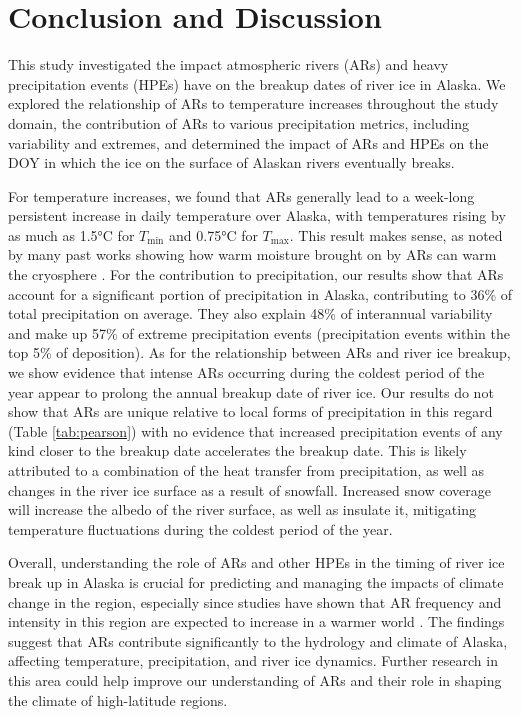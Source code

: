 \documentclass[12pts,draft]{AR_analysis_}
\begin{document}
\section{Conclusion and Discussion}

This study investigated the impact atmospheric rivers (ARs) and heavy precipitation events
(HPEs) have on the breakup dates of 
river ice in Alaska. We explored the relationship of ARs to temperature increases throughout 
the study domain, the contribution of ARs to various precipitation metrics, 
including variability and extremes, and determined the impact of ARs and HPEs on the DOY 
in which the ice on the surface of Alaskan rivers eventually breaks. 

For temperature increases, we found that ARs generally lead to a week-long persistent 
increase in daily temperature over Alaska, with temperatures rising by as much as 1.5°C 
for $T_{\text{min}}$ and 0.75°C for $T_{\text{max}}$. This result makes sense, as noted 
by many past works showing how warm moisture brought on by ARs can warm the cryosphere
\cite{Wille2021, Ma2023, ARs_lead_to_sea_ice_loss, Zhang2023}. For the contribution to 
precipitation, our results show that ARs account for a significant portion of precipitation 
in Alaska, contributing to 36\% of total precipitation on average. They also explain 48\% 
of interannual variability and make up 57\% of extreme precipitation events 
(precipitation events within the top 5\% of deposition). As for 
the relationship between ARs and river ice breakup, we show evidence that intense ARs
occurring during the coldest period of the year appear to prolong the annual breakup 
date of river ice. Our results do not show that ARs are unique relative to local forms of 
precipitation in this regard (Table \ref{tab:pearson}) with no evidence that increased 
precipitation events of any kind closer to the breakup date accelerates the breakup date.
This is likely attributed to a combination of the heat transfer from precipitation, 
as well as changes in the river ice surface as a result of snowfall. Increased snow coverage
will increase the albedo of the river surface, as well as insulate it, mitigating temperature 
fluctuations during the coldest period of the year. 

Overall, understanding the role of ARs and other HPEs in the
timing of river ice break up in Alaska is 
crucial for predicting and managing the impacts of climate change in the region, 
especially since studies have shown that AR frequency and intensity in this region are 
expected to increase in a warmer world \cite{Espinoza2018, Massoud2019}. The findings 
suggest that ARs contribute significantly to the hydrology and climate of Alaska, 
affecting temperature, precipitation, and river ice dynamics. Further research in this 
area could help improve our understanding of ARs and their role in shaping the climate 
of high-latitude regions.
\end{document}
